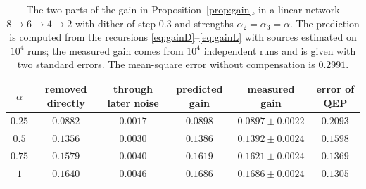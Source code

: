 \begin{table}[t]
\centering\small
\begin{tabular}{@{}cccccc@{}}
\toprule
$\alpha$ & removed directly & through later noise & predicted gain & measured gain & error of QEP\\
\midrule
$0.25$ & $0.0882$ & $0.0017$ & $0.0898$ & $0.0897\pm0.0022$ & $0.2093$\\
$0.5$ & $0.1356$ & $0.0030$ & $0.1386$ & $0.1392\pm0.0024$ & $0.1598$\\
$0.75$ & $0.1579$ & $0.0040$ & $0.1619$ & $0.1621\pm0.0024$ & $0.1369$\\
$1$ & $0.1640$ & $0.0046$ & $0.1686$ & $0.1686\pm0.0024$ & $0.1305$\\
\bottomrule
\end{tabular}
\caption{The two parts of the gain in Proposition~\ref{prop:gain}, in a linear network $8\to6\to4\to2$ with dither of step $0.3$ and strengths $\alpha_2=\alpha_3=\alpha$. The prediction is computed from the recursions \eqref{eq:gainD}--\eqref{eq:gainL} with sources estimated on $10^4$ runs; the measured gain comes from $10^4$ independent runs and is given with two standard errors. The mean-square error without compensation is $0.2991$.}\label{tab:split}
\end{table}
